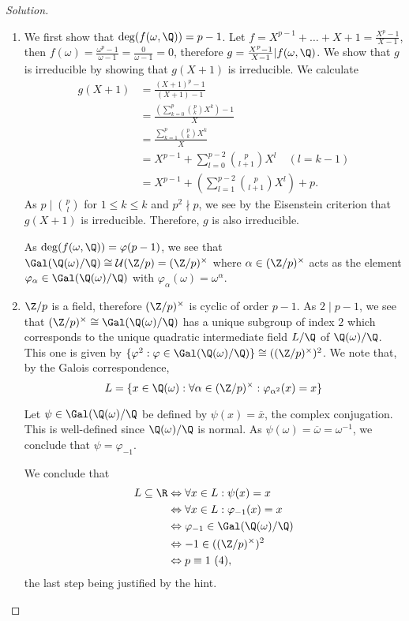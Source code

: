 \documentclass[a4paper,10pt,reqno]{amsart}
\newenvironment{sol}
  {\renewcommand\qedsymbol{$\blacksquare$}\begin{proof}[Solution]}
  {\end{proof}}
\begin{document}
\begin{sol}
    \begin{enumerate}[label=(\roman*)]
    \item We first show that $\deg(f(\omega,\Q)) = p-1$. Let $f = X^{p-1} + \ldots + X + 1 = \frac{X^p-1}{X-1}$, then $f(\omega) = \frac{\omega^p-1}{\omega -1} = \frac{0}{\omega - 1} = 0$, therefore $g =\frac{X^p-1}{X-1} | f(\omega,\Q) $. We show that $g$ is irreducible by showing that $g(X+1)$ is irreducible. We calculate
    \begin{align*}
        g(X+1) & = \frac{(X+1)^p-1}{(X+1)-1} \\
        & = \frac{\left(\sum_{k=0}^p \binom{p}{k}X^k\right)-1}{X} \\
        & = \frac{\sum_{k=1}^p\binom{p}{k}X^k}{X} \\
        & = X^{p-1} + \sum_{l=0}^{p-2} \binom{p}{l+1}X^l \quad (l = k-1) \\
        & = X^{p-1} + \left(\sum_{l=1}^{p-2} \binom{p}{l+1}X^l \right) + p.
    \end{align*}
    As $p \mid \binom{p}{l}$ for $1 \leq k \leq k$ and $p^2 \nmid p$, we see by the Eisenstein criterion that $g(X+1)$ is irreducible. Therefore, $g$ is also irreducible.

    As $\deg(f(\omega,\Q)) = \varphi(p-1)$, we see that $\Gal(\Q(\omega)/\Q) \cong \mathcal{U}(\Z/p) = (\Z/p)^{\times}$ where $\alpha \in (\Z/p)^{\times}$ acts as the element $\varphi_{\alpha} \in \Gal(\Q(\omega)/\Q)$ with $\varphi_{\alpha}(\omega) = \omega^{\alpha}$.

    \item $\Z/p$ is a field, therefore $(\Z/p)^{\times}$ is cyclic of order $p-1$. As $2\mid p-1$, we see that $(\Z/p)^{\times} \cong \Gal(\Q(\omega)/\Q)$ has a unique subgroup of index $2$ which corresponds to the unique quadratic intermediate field $L/\Q$ of $\Q(\omega)/\Q$. This one is given by $\{ \varphi^2 : \varphi \in \Gal(\Q(\omega)/\Q) \} \cong ((\Z/p)^{\times})^2$. We note that, by the Galois correspondence,
    \[
    L = \{ x \in \Q(\omega): \forall \alpha \in (\Z/p)^{\times}: \varphi_{\alpha^2}(x) = x \}
    \]

    Let $\psi \in \Gal(\Q(\omega)/\Q$ be defined by $\psi(x) = \overline{x}$, the complex conjugation. This is well-defined since $\Q(\omega)/\Q$ is normal. As $\psi(\omega) = \overline{\omega} = \omega^{-1}$, we conclude that $\psi = \varphi_{-1}$.

    We conclude that
    \begin{align*}
        L \subseteq \R & \Leftrightarrow \forall x \in L: \psi(x) = x \\
        & \Leftrightarrow \forall x \in L: \varphi_{-1}(x) = x \\
        & \Leftrightarrow \varphi_{-1} \in \Gal(\Q(\omega)/\Q) \\
        & \Leftrightarrow -1 \in ((\Z/p)^{\times})^2 \\
        & \Leftrightarrow p \equiv 1 \ (4),
    \end{align*}
    the last step being justified by the hint.


\end{enumerate}
\end{sol}
\end{document}
